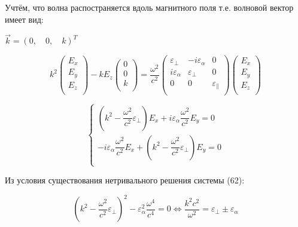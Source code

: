 \documentclass[a4paper,12pt]{article}
\begin{document}
	\quad Учтём, что волна распостраняется вдоль магнитного поля т.е. волновой вектор имеет вид:
	
	\begin{center}
		$\vec{k} = \left(0, \quad 0, \quad k\right)^T$
	\end{center}	
	
	\begin{equation}
		k^2\left(\begin{array}{c}
			E_x \\
			E_y \\
			E_z \\
		\end{array}\right) - kE_z\left(\begin{array}{c}
			0 \\
			0 \\
			k \\
		\end{array}\right) = \dfrac{\omega^2}{c^2} \left(\begin{array}{ccc}
		\varepsilon_{\perp} & -i\varepsilon_{\alpha} & 0 \\
		i\varepsilon_{\alpha} & \varepsilon_{\perp} & 0 \\
		0 & 0 & \varepsilon_{\parallel} \\ 
		\end{array}\right) \left(\begin{array}{c}
		E_x \\
		E_y \\
		E_z \\
		\end{array}\right)
	\end{equation}
	
	\begin{equation}
		\begin{cases}
			\left(k^2 -\dfrac{\omega^2}{c^2}\varepsilon_\perp\right)E_x + i\varepsilon_\alpha \dfrac{\omega^2}{c^2} E_y = 0 \\ 
			-i\varepsilon_\alpha\dfrac{\omega^2}{c^2} E_x + \left(k^2 - \dfrac{\omega^2}{c^2}\varepsilon_\perp\right) E_y = 0\\
		\end{cases}
	\end{equation}
	
	\quad Из условия существования нетривального решения системы (62):
	
	\begin{equation}
		\left(k^2 - \dfrac{\omega^2}{c^2}\varepsilon_\perp\right)^2 - \varepsilon_\alpha^2 \dfrac{\omega^4}{c^4} = 0 \Leftrightarrow \dfrac{k^2 c^2}{\omega^2} = \varepsilon_\perp \pm \varepsilon_\alpha
	\end{equation}
	
\end{document}
